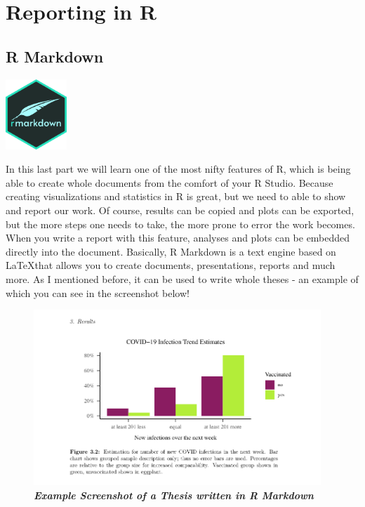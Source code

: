 \documentclass[
]{book}
\begin{document}
\part{Reporting in R}\label{part-reporting-in-r}

\chapter{R Markdown}\label{r-markdown}

\includegraphics[width=\textwidth,height=1.04167in]{./img/rmd.png}

In this last part we will learn one of the most nifty features of R, which is being able to create whole documents from the comfort of your R Studio.
Because creating visualizations and statistics in R is great, but we need to able to show and report our work.
Of course, results can be copied and plots can be exported, but the more steps one needs to take, the more prone to error the work becomes. When you write a report with this feature, analyses and plots can be embedded directly into the document.
Basically, R Markdown is a text engine based on \LaTeX that allows you to create documents, presentations, reports and much more.
As I mentioned before, it can be used to write whole theses - an example of which you can see in the screenshot below!

\begin{figure}
\centering
\includegraphics[width=\textwidth,height=2.60417in]{./img/MArmdex.png}
\caption{\emph{\textbf{Example Screenshot of a Thesis written in R Markdown}}}
\end{figure}
\end{document}
